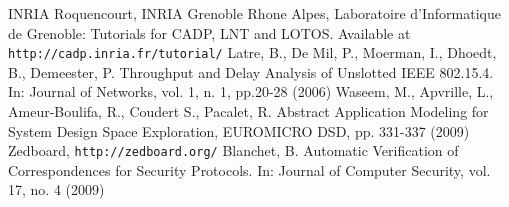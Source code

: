 \documentclass{llncs}
\begin{document}
\begin{flushleft}
\begin{thebibliography}{99}
%
INRIA Roquencourt, INRIA Grenoble Rhone Alpes, Laboratoire d'Informatique de Grenoble: Tutorials for CADP, LNT and
LOTOS. Available at \texttt{http://cadp.inria.fr/tutorial/}
%
Latre, B., De Mil, P., Moerman, I., Dhoedt, B., Demeester, P. Throughput and Delay Analysis of Unslotted IEEE 802.15.4.
In: Journal of Networks, vol. 1, n. 1, pp.20-28 (2006)
%
Waseem, M., Apvrille, L., Ameur-Boulifa, R., Coudert S., Pacalet, R. Abstract Application Modeling for System Design
Space Exploration, EUROMICRO DSD, pp. 331-337 (2009)
%
%
Zedboard, \texttt{http://zedboard.org/}
%
Blanchet, B. Automatic Verification of Correspondences for Security Protocols. In: Journal of Computer Security, vol.
17, no. 4 (2009)
%
\end{thebibliography}
\end{flushleft}
\end{document}
